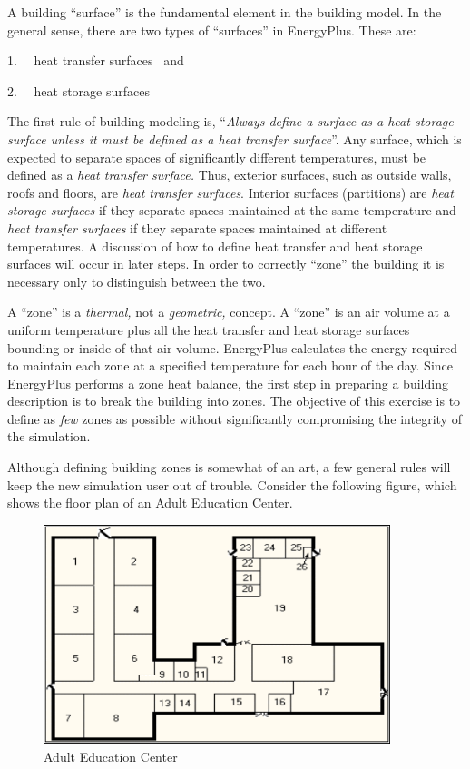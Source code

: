 A building ``surface'' is the fundamental element in the building model. In the general sense, there are two types of ``surfaces'' in EnergyPlus. These are:

1.~~ heat transfer surfaces~ and

2.~~ heat storage surfaces

The first rule of building modeling is, ``\emph{Always define a surface as a heat storage surface unless it must be defined as a heat transfer surface}''. Any surface, which is expected to separate spaces of significantly different temperatures, must be defined as a \emph{heat transfer surface.} Thus, exterior surfaces, such as outside walls, roofs and floors, are \emph{heat transfer surfaces}. Interior surfaces (partitions) are \emph{heat storage surfaces} if they separate spaces maintained at the same temperature and \emph{heat transfer surfaces} if they separate spaces maintained at different temperatures. A discussion of how to define heat transfer and heat storage surfaces will occur in later steps. In order to correctly ``zone'' the building it is necessary only to distinguish between the two.

A ``zone'' is a \emph{thermal,} not a \emph{geometric,} concept. A ``zone'' is an air volume at a uniform temperature plus all the heat transfer and heat storage surfaces bounding or inside of that air volume. EnergyPlus calculates the energy required to maintain each zone at a specified temperature for each hour of the day. Since EnergyPlus performs a zone heat balance, the first step in preparing a building description is to break the building into zones. The objective of this exercise is to define as \emph{few} zones as possible without significantly compromising the integrity of the simulation.

Although defining building zones is somewhat of an art, a few general rules will keep the new simulation user out of trouble. Consider the following figure, which shows the floor plan of an Adult Education Center.

\begin{figure}[hbtp] %
\centering
\includegraphics[width=0.9\textwidth, height=0.9\textheight, keepaspectratio=true]{media/image012.png}
\caption{Adult Education Center \protect \label{fig:adult-education-center}}
\end{figure}

